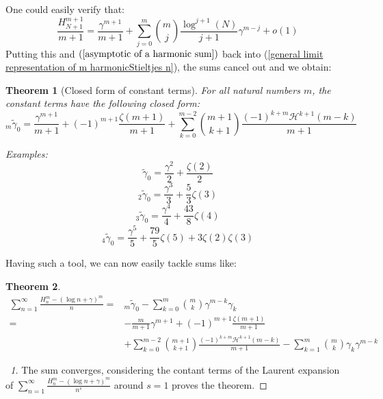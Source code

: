 \documentclass{article}
\newcommand{\pHz}[2]{\mathcal{H}^{#1}(#2)}
\newcommand{\HarmonicStieltjesconstants}[1]{\tilde{\gamma}_{#1}}
\newcommand{\secondharmonicStieltjesconstants}[1]{{}_2\tilde{\gamma}_{#1}}
\newcommand{\thirdharmonicStieltjescosntants}[1]{{}_3\tilde{\gamma}_{#1}}
\newcommand{\fourthharmonicStieltjescosntants}[1]{{}_4\tilde{\gamma}_{#1}}
\newcommand{\anythharmonicStieltjescosntants}[2]{{}_{#1}\tilde{\gamma}_{#2}}
\newtheorem{theorem}{Theorem}
\begin{document}
One could easily verify that:
\begin{equation} \label{power of harmonic numbers asymp}\frac{H_{N+1}^{m+1}}{m+1} =\frac{\gamma^{m+1}}{m+1}+\sum_{j=0}^m \binom{m}{j} \frac{\log^{j+1}(N)}{j+1}\gamma^{m-j}+o(1)\end{equation}
Putting this and $(\ref{asymptotic of a harmonic sum})$ back into (\ref{general limit representation of m harmonicStieltjes n}), the sums cancel out and we obtain:
\begin{theorem}[Closed form of constant terms] For all natural numbers $m$, the constant terms have the following closed form:
    \begin{equation}
    \anythharmonicStieltjescosntants{m}{0}=\frac{\gamma^{m+1}}{m+1}+(-1)^{m+1}\frac{\zeta(m+1)}{m+1}+\sum_{k=0}^{m-2} \binom{m+1}{k+1} \frac{(-1)^{k+m} \pHz{k+1}{m-k}}{m+1}
\end{equation}
\end{theorem}
\textit{Examples:}
\[\HarmonicStieltjesconstants{0}=\frac{\gamma^2}{2}+\frac{\zeta(2)}{2}\]
\[\secondharmonicStieltjesconstants{0}=\frac{\gamma^3}{3}+ \frac{5}{3}\zeta(3)\]
\[ \thirdharmonicStieltjescosntants{0}=\frac{\gamma^4}{4}+\frac{43}{8}\zeta(4)\]
\[\fourthharmonicStieltjescosntants{0}=\frac{\gamma^5}{5}+\frac{79}{5}\zeta(5)+3\zeta(2)\zeta(3)\]

Having such a tool, we can now easily tackle sums like:
\begin{theorem}
\begin{equation}\label{Solved sum}\begin{split}\sum_{n=1}^{\infty}\frac{H_n^m-(\log n+\gamma)^m}{n}= &{}_m \tilde\gamma_{0}-\sum_{k=0}^{m}\binom{m}{k}\gamma^{m-k}\gamma_k \\ =& -\frac{m}{m+1}\gamma^{m+1}+(-1)^{m+1}\frac{\zeta(m+1)}{m+1}\\ & +\sum_{k=0}^{m-2}\binom{m+1}{k+1}\frac{(-1)^{k+m}\mathcal{H}^{k+1}(m-k)}{m+1} 
-\sum_{k=1}^{m}\binom{m}{k}\gamma_k\gamma^{m-k}\end{split}\end{equation}
\end{theorem}

\begin{proof} [\proofname\ 1]
    The sum converges, considering the contant terms of the Laurent expansion of $\sum_{n=1}^{\infty}\frac{H_n^m-(\log n+ \gamma)^m}{n^{s}}$ around $s=1$ proves the theorem. 
\end{proof}
\end{document}
